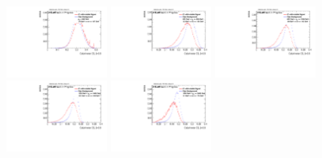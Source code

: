 \begin{figure}[H]
\includegraphics[width=0.3\textwidth]{sascha_input/Appendix/Distributions/higgs/distributions/beta05/h_recoJet_C2_05_bin1.pdf} \hspace{1mm}
\includegraphics[width=0.3\textwidth]{sascha_input/Appendix/Distributions/higgs/distributions/beta05/h_recoJet_C2_05_bin2.pdf} \hspace{4mm}
\includegraphics[width=0.3\textwidth]{sascha_input/Appendix/Distributions/higgs/distributions/beta05/h_recoJet_C2_05_bin3.pdf} 
\bigskip
\includegraphics[width=0.3\textwidth]{sascha_input/Appendix/Distributions/higgs/distributions/beta05/h_recoJet_C2_05_bin4.pdf} \hspace{4mm}
\includegraphics[width=0.3\textwidth]{sascha_input/Appendix/Distributions/higgs/distributions/beta05/h_recoJet_C2_05_bin5.pdf} 


\end{figure}
